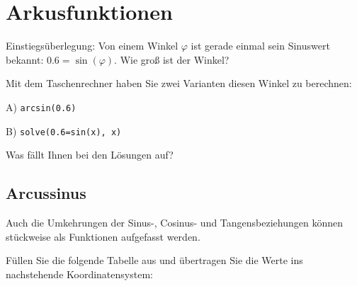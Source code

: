 
\section{Arkusfunktionen}

Einstiegsüberlegung: Von einem Winkel $\varphi$ ist gerade einmal sein Sinuswert bekannt: $0.6 = \sin(\varphi)$. Wie groß ist der Winkel?

\trigsysDsin{}



Mit dem Taschenrechner haben Sie zwei Varianten diesen Winkel zu berechnen:

A) \texttt{arcsin(0.6)}

B) \texttt{solve(0.6=sin(x), x)}

Was fällt Ihnen bei den Lösungen auf?
\newpage



\subsection{Arcussinus}
Auch die Umkehrungen der Sinus-, Cosinus- und Tangensbeziehungen
können stückweise als Funktionen aufgefasst werden.

Füllen Sie die folgende Tabelle aus und übertragen Sie die Werte ins nachstehende
Koordinatensystem:


